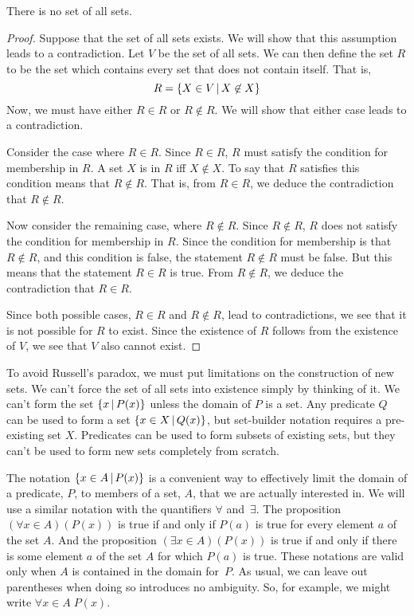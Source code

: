 \begin{theorem}\label{T-Russell}
There is no set of all sets.
\end{theorem}
\begin{proof}
Suppose that the set of all sets exists.
We will show that this assumption leads to a contradiction.
Let $V$ be the set of all sets.
We can then define the set $R$ to be the set which contains every set that does not contain itself.
That is,
\[R=\{X\in V\,|\, X\not\in X\}\]
Now, we must have either $R\in R$ or $R\not\in R$.
We will show that either case leads to a contradiction.

Consider the case where $R\in R$.
Since $R\in R$, $R$ must satisfy the condition for membership in $R$.
A set $X$ is in $R$ iff $X\not\in X$.
To say that $R$ satisfies this condition means that $R\not\in R$.
That is, from $R\in R$, we deduce the contradiction that $R\not\in R$.

Now consider the remaining case, where $R\not\in R$.
Since $R\not\in R$, $R$ does not satisfy the condition for membership in $R$.
Since the condition for membership is that $R\not\in R$, and this condition is false, the statement $R\not\in R$ must be false.
But this means that the statement $R\in R$ is true.
From $R\not\in R$, we deduce the contradiction that $R\in R$.

Since both possible cases, $R\in R$ and $R\not\in R$, lead to contradictions, we see that it is not possible for $R$ to exist.
Since the existence of $R$ follows from the existence of $V$, we see that $V$ also cannot exist.
\end{proof}

To avoid Russell's paradox, we must put limitations on the construction of new sets.
We can't force the set of all sets into existence simply by thinking of it.
We can't form the set $\{x\,|\, P(x)\}$ unless the domain of $P$ is a set.
Any predicate $Q$ can be used to form a set $\{x\in X\,|\, Q(x)\}$, but set-builder notation requires a pre-existing set $X$.
Predicates can be used to form subsets of existing sets, but they can't be used to form new sets completely from scratch.

\medskip

The notation $\{x\in A\,|\, P(x)\}$ is a convenient way to effectively limit the domain of a predicate, $P$, to members of a set, $A$, that we are actually interested in.
We will use a similar notation with the quantifiers $\forall$ and~$\exists$.
The proposition $(\forall x\in A)(P(x))$ is true if and only if $P(a)$ is true for every element $a$ of the set $A$.
And the proposition $(\exists x\in A)(P(x))$ is true if and only if there is some element $a$ of the set $A$ for which $P(a)$ is true.
These notations are valid only when $A$ is contained in the domain for~$P$.
As usual, we can leave out parentheses when doing so introduces no ambiguity.
So, for example, we might write $\forall x\in A\;P(x)$.

